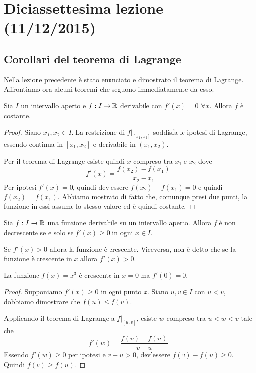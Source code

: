 \chapter{Diciassettesima lezione (11/12/2015)}

\section{Corollari del teorema di Lagrange}

Nella lezione precedente è stato enunciato e dimostrato il teorema di Lagrange. Affrontiamo ora alcuni teoremi che seguono immediatamente da esso.

\begin{corollary}
Sia $I$ un intervallo aperto e $f: I \to \mathbb R$ derivabile con $f'(x) = 0$ $\forall x$. Allora $f$ è costante.
\end{corollary}

\begin{proof}
Siano $x_1, x_2 \in I$. La restrizione di $f|_{[x_1, x_2]}$ soddisfa le ipotesi di Lagrange, essendo continua in $[x_1, x_2]$ e derivabile in $(x_1, x_2)$.

Per il teorema di Lagrange esiste quindi $x$ compreso tra $x_1$ e $x_2$ dove \begin{equation*}
f'(x) = \frac{f(x_2) - f(x_1)}{x_2 - x_1}
\end{equation*}
Per ipotesi $f'(x) = 0$, quindi dev'essere $f(x_2)-f(x_1)=0$ e quindi $f(x_2) = f(x_1)$. Abbiamo mostrato di fatto che, comunque presi due punti, la funzione in essi assume lo stesso valore ed è quindi costante.
\end{proof}

\begin{corollary}
Sia $f: I \to \mathbb R$ una funzione derivabile su un intervallo aperto. Allora $f$ è non decrescente se e solo se $f'(x) \ge 0$ in ogni $x \in I$.
\end{corollary}

\begin{remark}
Se $f'(x) > 0$ allora la funzione è crescente. Viceversa, non è detto che se la funzione è crescente in $x$ allora $f'(x) > 0$.
\end{remark}

\begin{example}
La funzione $f(x) = x^3$ è crescente in $x = 0$ ma $f'(0) = 0$.
\end{example}

\begin{proof}
Supponiamo $f'(x) \ge 0$ in ogni punto $x$. Siano $u, v \in I$ con $u < v$, dobbiamo dimostrare che $f(u) \le f(v)$.

Applicando il teorema di Lagrange a $f|_{[u,v]}$, esiste $w$ compreso tra $u < w < v$ tale che
\begin{equation*}
f'(w) = \frac{f(v)-f(u)}{v-u}
\end{equation*}
Essendo $f'(w) \ge 0$ per ipotesi e $v - u > 0$, dev'essere $f(v)-f(u) \ge 0$. Quindi $f(v) \ge f(u)$.
\end{proof}

